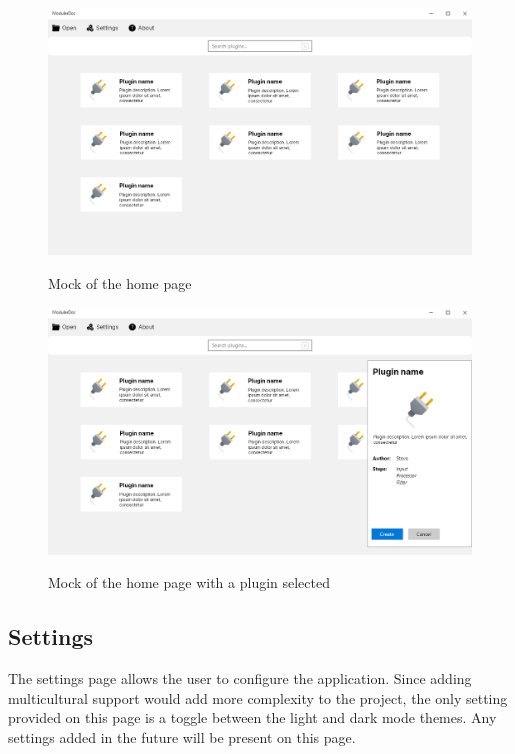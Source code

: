 \begin{figure}[H]
    \includegraphics[width=\linewidth]{img/mockHome.png}
    \label{fig:homePage}
    \caption{Mock of the home page}
\end{figure}

\begin{figure}[H]
    \includegraphics[width=\linewidth]{img/mockHome-PluginSelected.png}
    \label{fig:homePagePluginSelected}
    \caption{Mock of the home page with a plugin selected}
\end{figure}

\pagebreak
\subsection{Settings}

The settings page allows the user to configure the application. Since adding multicultural support would add more complexity to the project, the only setting provided on this page is a toggle between the light and dark mode themes. Any settings added in the future will be present on this page.

